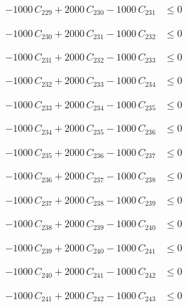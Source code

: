 \documentclass[a4paper,11pt]{article}
\begin{document}
\begin{align}
-1000\,C_{229} + 2000\,C_{230} - 1000\,C_{231} &\leq 0 \nonumber
\end{align}

\begin{align}
-1000\,C_{230} + 2000\,C_{231} - 1000\,C_{232} &\leq 0 \nonumber
\end{align}

\begin{align}
-1000\,C_{231} + 2000\,C_{232} - 1000\,C_{233} &\leq 0 \nonumber
\end{align}

\begin{align}
-1000\,C_{232} + 2000\,C_{233} - 1000\,C_{234} &\leq 0 \nonumber
\end{align}

\begin{align}
-1000\,C_{233} + 2000\,C_{234} - 1000\,C_{235} &\leq 0 \nonumber
\end{align}

\begin{align}
-1000\,C_{234} + 2000\,C_{235} - 1000\,C_{236} &\leq 0 \nonumber
\end{align}

\begin{align}
-1000\,C_{235} + 2000\,C_{236} - 1000\,C_{237} &\leq 0 \nonumber
\end{align}

\begin{align}
-1000\,C_{236} + 2000\,C_{237} - 1000\,C_{238} &\leq 0 \nonumber
\end{align}

\begin{align}
-1000\,C_{237} + 2000\,C_{238} - 1000\,C_{239} &\leq 0 \nonumber
\end{align}

\begin{align}
-1000\,C_{238} + 2000\,C_{239} - 1000\,C_{240} &\leq 0 \nonumber
\end{align}

\begin{align}
-1000\,C_{239} + 2000\,C_{240} - 1000\,C_{241} &\leq 0 \nonumber
\end{align}

\begin{align}
-1000\,C_{240} + 2000\,C_{241} - 1000\,C_{242} &\leq 0 \nonumber
\end{align}

\begin{align}
-1000\,C_{241} + 2000\,C_{242} - 1000\,C_{243} &\leq 0 \nonumber
\end{align}
\end{document}
